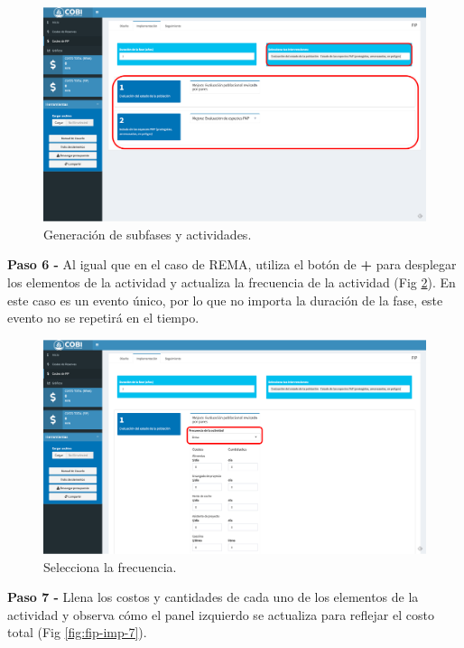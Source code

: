 \documentclass[
]{book}
\begin{document}
\begin{figure}
\centering
\includegraphics{images/fip-imp-5.png}
\caption{\label{fig:fip-imp-5}Generación de subfases y actividades.}
\end{figure}

\textbf{Paso 6 - } Al igual que en el caso de REMA, utiliza el botón de \textbf{+} para desplegar los elementos de la actividad y actualiza la frecuencia de la actividad (Fig \ref{fig:fip-imp-6}). En este caso es un evento único, por lo que no importa la duración de la fase, este evento no se repetirá en el tiempo.

\begin{figure}
\centering
\includegraphics{images/fip-imp-6.png}
\caption{\label{fig:fip-imp-6}Selecciona la frecuencia.}
\end{figure}

\textbf{Paso 7 - } Llena los costos y cantidades de cada uno de los elementos de la actividad y observa cómo el panel izquierdo se actualiza para reflejar el costo total (Fig \ref{fig:fip-imp-7}).
\end{document}
